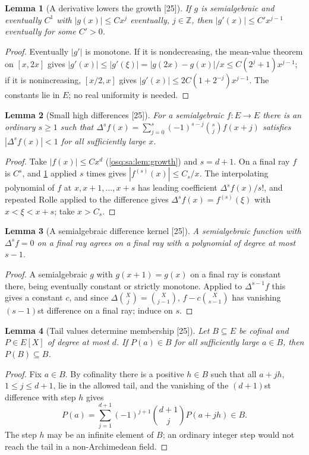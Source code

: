 \documentclass[11pt,letterpaper]{article}
\numberwithin{equation}{section}
\newtheorem{lemma}[lemma]{Lemma}
\theoremstyle{definition}
\theoremstyle{remark}
\theoremstyle{plain}
\newcommand{\Z}{\mathbb Z}
\newcommand{\src}[1]{\textup{\textsf{[#1]}}}
\begin{document}
\begin{lemma}[A derivative lowers the growth \src{25}]\label{osq:sa:lem:derivative}
If $g$ is semialgebraic and eventually $C^1$ with $|g(x)|\le Cx^j$ eventually, $j\in\Z$, then $|g'(x)|\le C'x^{j-1}$ eventually for some $C'>0$.
\end{lemma}
\begin{proof}
Eventually $|g'|$ is monotone. If it is nondecreasing, the mean-value theorem on $[x,2x]$ gives $|g'(x)|\le|g'(\xi)|=|g(2x)-g(x)|/x\le
C(2^j+1)x^{j-1}$; if it is nonincreasing, $[x/2,x]$ gives $|g'(x)|\le2C(1+2^{-j})x^{j-1}$. The constants lie in $E$; no real uniformity is needed.
\end{proof}

\begin{lemma}[Small high differences \src{25}]\label{osq:sa:lem:differences}
For a semialgebraic $f:E\to E$ there is an ordinary $s\ge1$ such that $\Delta^sf(x)=\sum_{j=0}^s(-1)^{s-j}\binom sjf(x+j)$ satisfies $|\Delta^sf(x)|<1$
for all sufficiently large $x$.
\end{lemma}
\begin{proof}
Take $|f(x)|\le Cx^d$ (\cref{osq:sa:lem:growth}) and $s=d+1$. On a final ray $f$ is $C^s$, and \cref{osq:sa:lem:derivative} applied $s$ times gives
$|f^{(s)}(x)|\le C_s/x$. The interpolating polynomial of $f$ at $x,x+1,\dots,x+s$ has leading coefficient $\Delta^sf(x)/s!$, and repeated Rolle applied to
the difference gives $\Delta^sf(x)=f^{(s)}(\xi)$ with $x<\xi<x+s$; take $x>C_s$.
\end{proof}

\begin{lemma}[A semialgebraic difference kernel \src{25}]\label{osq:sa:lem:kernel}
A semialgebraic function with $\Delta^sf=0$ on a final ray agrees on a final ray with a polynomial of degree at most $s-1$.
\end{lemma}
\begin{proof}
A semialgebraic $g$ with $g(x+1)=g(x)$ on a final ray is constant there, being eventually constant or strictly monotone. Applied to
$\Delta^{s-1}f$ this gives a constant $c$, and since $\Delta\binom Xj=\binom X{j-1}$, $f-c\binom X{s-1}$ has vanishing $(s-1)$st difference on a
final ray; induce on $s$.
\end{proof}

\begin{lemma}[Tail values determine membership \src{25}]\label{osq:sa:lem:tailmembership}
Let $B\subseteq E$ be cofinal and $P\in E[X]$ of degree at most $d$. If $P(a)\in B$ for all sufficiently large $a\in B$, then $P(B)\subseteq B$.
\end{lemma}
\begin{proof}
Fix $a\in B$. By cofinality there is a positive $h\in B$ such that all $a+jh$, $1\le j\le d+1$, lie in the allowed tail, and the vanishing of the
$(d+1)$st difference with step $h$ gives
\begin{equation}\label{osq:sa:eq:extrapolation}
 P(a)=\sum_{j=1}^{d+1}(-1)^{j+1}\binom{d+1}jP(a+jh)\in B .
\end{equation}
The step $h$ may be an infinite element of $B$; an ordinary integer step would not reach the tail in a non-Archimedean field.
\end{proof}
\end{document}
